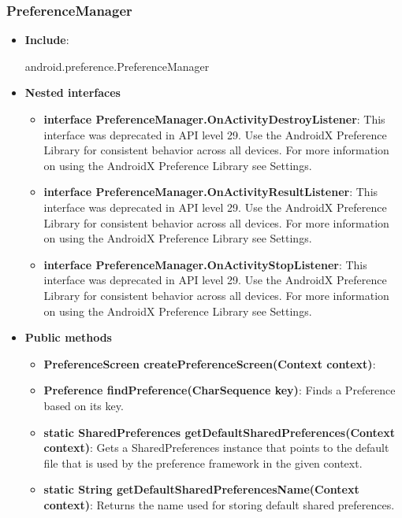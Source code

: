 \documentclass{report}
\begin{document}
    \subsubsection{PreferenceManager}
    \begin{itemize}
        \item \textbf{Include}:
            \bigbreak \noindent 
            \begin{javacode}
                android.preference.PreferenceManager
            \end{javacode}
        \item \textbf{Nested interfaces}
            \begin{itemize}
                \item \textbf{interface	PreferenceManager.OnActivityDestroyListener}: This interface was deprecated in API level 29. Use the AndroidX Preference Library for consistent behavior across all devices. For more information on using the AndroidX Preference Library see Settings. 
                \item \textbf{interface	PreferenceManager.OnActivityResultListener}: This interface was deprecated in API level 29. Use the AndroidX Preference Library for consistent behavior across all devices. For more information on using the AndroidX Preference Library see Settings. 
                \item \textbf{interface	PreferenceManager.OnActivityStopListener}: This interface was deprecated in API level 29. Use the AndroidX Preference Library for consistent behavior across all devices. For more information on using the AndroidX Preference Library see Settings. 
            \end{itemize}
        \item \textbf{Public methods}
            \begin{itemize}
                \item \textbf{PreferenceScreen	createPreferenceScreen(Context context)}:
                \item \textbf{Preference	findPreference(CharSequence key)}: Finds a Preference based on its key.
                \item \textbf{static SharedPreferences	getDefaultSharedPreferences(Context context)}: Gets a SharedPreferences instance that points to the default file that is used by the preference framework in the given context.
                \item \textbf{static String	getDefaultSharedPreferencesName(Context context)}: Returns the name used for storing default shared preferences.

\end{itemize}
\end{itemize}
\end{document}
